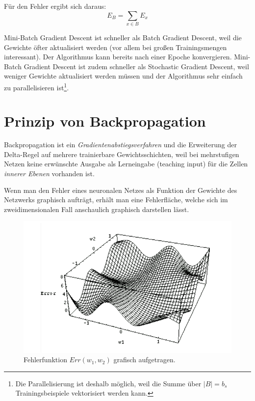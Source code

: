 Für den Fehler ergibt sich daraus:
\[
	E_B = \sum_{x \in B} E_x
\]

Mini-Batch Gradient Descent ist schneller als Batch Gradient Descent, weil die Gewichte öfter aktualisiert werden (vor allem bei großen Trainingsmengen interessant). Der Algorithmus kann bereits nach einer Epoche konvergieren.
Mini-Batch Gradient Descent ist zudem schneller als Stochastic Gradient Descent, weil weniger Gewichte aktualisiert werden müssen und der Algorithmus sehr einfach zu parallelisieren ist\footnote{Die Parallelisierung ist deshalb möglich, weil die Summe über $|B| = b_s$ Trainingsbeispiele vektorisiert werden kann.}.


\section*{Prinzip von Backpropagation}
Backpropagation ist ein \emph{Gradientenabstiegsverfahren} und die Erweiterung der Delta-Regel auf mehrere trainierbare Gewichtsschichten, weil bei mehrstufigen Netzen keine erwünschte Ausgabe als Lerneingabe (teaching input) für die Zellen \emph{innerer Ebenen} vorhanden ist.

Wenn man den Fehler eines neuronalen Netzes als Funktion der Gewichte des Netzwerks graphisch aufträgt, erhält man eine Fehlerfläche, welche sich im zweidimensionalen Fall anschaulich graphisch darstellen lässt.

\begin{figure}[ht!] \centering 
	\includegraphics[width=\linewidth]{figures/ch03_fehlerflaeche.pdf}
	\caption{Fehlerfunktion $Err(w_1, w_2)$ grafisch aufgetragen.}
	\label{fig:ch03_fehlerflaeche}
\end{figure}

